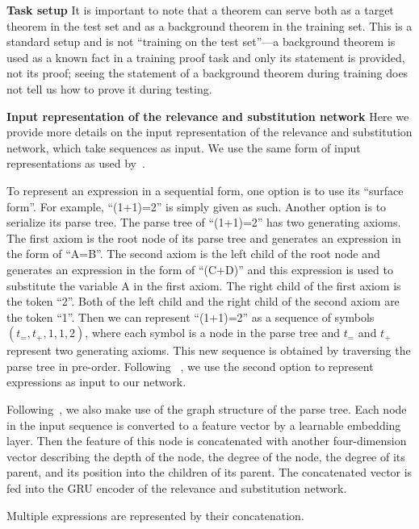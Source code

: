 \documentclass{article}
\begin{document}
\noindent\textbf{Task setup}
It is important to note that a theorem can serve both as a target theorem in the test set and as a background theorem in the training set. This is a standard setup and is not ``training on the test set''---a background theorem is used as a known fact in a training proof task and only its statement is provided, not its proof; seeing the statement of a background theorem during training does not tell us how to prove it during testing. 

\noindent\textbf{Input representation of the relevance and substitution network}
Here we provide more details on the input representation of the relevance and substitution network, which take sequences as input. 
We use the same form of input representations 
 as used by~\citet{whalen2016holophrasm}.

To represent an expression in a sequential form, one option is to use its ``surface form''.  
For example, ``(1+1)=2'' is simply given as such. Another option is to serialize its parse tree. 
The parse tree of ``(1+1)=2'' has two generating axioms.
The first axiom is the root node of its parse tree and generates an expression in the form of ``A=B''.
The second axiom is the left child of the root node and generates 
an expression in the form of ``(C+D)'' and this expression is used to substitute the variable A in the first axiom.
The right child of the first axiom is the token ``2''.
Both of the left child and the right child of the second axiom are the token ``1''. 
Then we can represent ``(1+1)=2'' as a sequence of symbols
$(t_=, t_+, 1, 1, 2)$,
where each symbol is a node in the parse tree and $t_=$ and $t_+$ represent two generating axioms.
This new sequence is obtained by traversing the parse tree in pre-order. Following ~\citet{whalen2016holophrasm}, we use the second option to represent expressions as input to our network.

Following~\citet{whalen2016holophrasm},
we also make use of the graph structure of the parse tree.
Each node in the input sequence is converted 
to a feature vector by a learnable embedding layer. 
Then the feature of this node is concatenated with another four-dimension vector describing  
the depth of the node, the degree of the node, the degree of its parent, and its position into the children of its parent.
The concatenated vector is fed into the GRU encoder of the relevance and substitution network.

Multiple expressions are represented by 
their concatenation.
\end{document}
